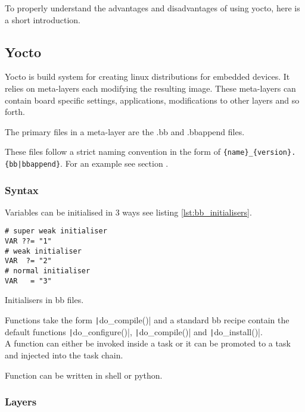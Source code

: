 \documentclass[../../main.tex]{subfiles}
\begin{document}
To properly understand the advantages and disadvantages of using yocto, here is a short introduction.

\subsection{Yocto}%
\label{sub:yocto}

Yocto is build system for creating linux distributions for embedded devices. It relies on meta-layers
each modifying the resulting image. These meta-layers can contain board specific settings,
applications, modifications to other layers and so forth.

The primary files in a meta-layer are the .bb and .bbappend files.

These files follow a strict naming convention in the form of
\texttt{\{name\}\_\{version\}.\{bb|bbappend\}}. For an example see section .

\subsubsection{Syntax}%
\label{ssub:syntax}

Variables can be initialised in 3 ways see listing \ref{lst:bb_initialisers}.
\begin{listing}[h]
\begin{verbatim}
# super weak initialiser
VAR ??= "1" 
# weak initialiser
VAR  ?= "2" 
# normal initialiser
VAR   = "3" 
\end{verbatim}
\caption{Initialisers in bb files.}
\label{lst:bb_initialisers}
\end{listing}


Functions take the form \texttt|do_compile(){}| and a standard bb recipe contain
the default functions \texttt|do_configure(){}|, \texttt|do_compile(){}|
and \texttt|do_install(){}|.\\

A function can either be invoked inside a task or it can be promoted to a task and injected into 
the task chain.

Function can be written in shell or python.

\subsubsection{Layers}%
\label{ssub:layers}
\end{document}
